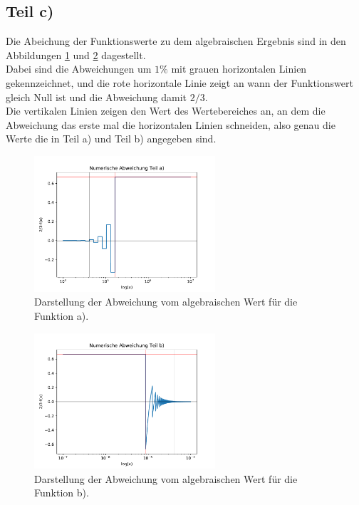 \subsection{Teil c)}
Die Abeichung der Funktionswerte zu dem algebraischen Ergebnis sind in
den Abbildungen \ref{fig:A1a} und \ref{fig:A1b} dagestellt.\\
Dabei sind die Abweichungen um $1\%$ mit grauen horizontalen Linien gekennzeichnet,
und die rote horizontale Linie zeigt an wann der Funktionswert gleich Null ist
und die Abweichung damit $2/3$.\\
Die vertikalen Linien zeigen den Wert des Wertebereiches an, an dem die Abweichung
das erste mal die horizontalen Linien schneiden, also genau die Werte die in Teil a)
und Teil b) angegeben sind.
\begin{figure}[H]
  \centering
  \includegraphics[width=0.6\textwidth]{plots/Aufgabe1a.pdf}
  \caption{Darstellung der Abweichung vom algebraischen Wert für die Funktion a).}
  \label{fig:A1a}
\end{figure}
\begin{figure}[H]
  \centering
  \includegraphics[width=0.6\textwidth]{plots/Aufgabe1b.pdf}
  \caption{Darstellung der Abweichung vom algebraischen Wert für die Funktion b).}
  \label{fig:A1b}
\end{figure}
